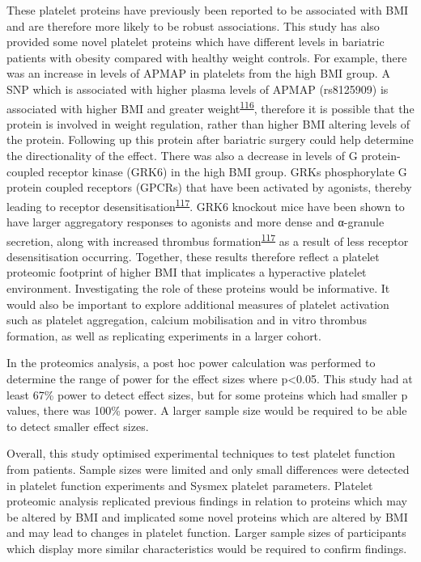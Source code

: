 \documentclass[11pt,twoside]{bristolthesis}
\begin{document}
These platelet proteins have previously been reported to be associated with BMI and are therefore more likely to be robust associations. This study has also provided some novel platelet proteins which have different levels in bariatric patients with obesity compared with healthy weight controls. For example, there was an increase in levels of APMAP in platelets from the high BMI group. A SNP which is associated with higher plasma levels of APMAP (rs8125909) is associated with higher BMI and greater weight\textsuperscript{\protect\hyperlink{ref-Liu2021}{116}}, therefore it is possible that the protein is involved in weight regulation, rather than higher BMI altering levels of the protein. Following up this protein after bariatric surgery could help determine the directionality of the effect. There was also a decrease in levels of G protein-coupled receptor kinase (GRK6) in the high BMI group. GRKs phosphorylate G protein coupled receptors (GPCRs) that have been activated by agonists, thereby leading to receptor desensitisation\textsuperscript{\protect\hyperlink{ref-Chaudhary2020}{117}}. GRK6 knockout mice have been shown to have larger aggregatory responses to agonists and more dense and α-granule secretion, along with increased thrombus formation\textsuperscript{\protect\hyperlink{ref-Chaudhary2020}{117}} as a result of less receptor desensitisation occurring. Together, these results therefore reflect a platelet proteomic footprint of higher BMI that implicates a hyperactive platelet environment. Investigating the role of these proteins would be informative. It would also be important to explore additional measures of platelet activation such as platelet aggregation, calcium mobilisation and in vitro thrombus formation, as well as replicating experiments in a larger cohort.

In the proteomics analysis, a post hoc power calculation was performed to determine the range of power for the effect sizes where p\textless0.05. This study had at least 67\% power to detect effect sizes, but for some proteins which had smaller p values, there was 100\% power. A larger sample size would be required to be able to detect smaller effect sizes.

Overall, this study optimised experimental techniques to test platelet function from patients. Sample sizes were limited and only small differences were detected in platelet function experiments and Sysmex platelet parameters. Platelet proteomic analysis replicated previous findings in relation to proteins which may be altered by BMI and implicated some novel proteins which are altered by BMI and may lead to changes in platelet function. Larger sample sizes of participants which display more similar characteristics would be required to confirm findings.
\end{document}
